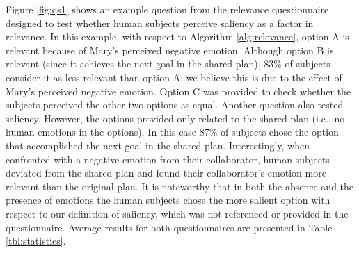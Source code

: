 \documentclass{article}
\begin{document}
Figure \ref{fig:qs1} shows an example question from the relevance questionnaire
designed to test whether human subjects perceive saliency as a factor in
relevance. In this example, with respect to Algorithm \ref{alg:relevance},
option A is relevant because of Mary's perceived negative emotion. Although
option B is relevant (since it achieves the next goal in the shared plan), 83\% of
subjects consider it as less relevant than option A; we believe this is due to
the effect of Mary's perceived negative emotion. Option C was provided to
check whether the subjects perceived the other two options as equal. Another
question also tested saliency. However, the options provided only related to the
shared plan (i.e., no human emotions in the options). In this case 87\% of
subjects chose the option that accomplished the next goal in the shared plan.
Interestingly, when confronted with a negative emotion from their collaborator,
human subjects deviated from the shared plan and found their collaborator's
emotion more relevant than the original plan. It is noteworthy that in both the
absence and the presence of emotions the human subjects chose the more salient
option with respect to our definition of saliency, which was not referenced or
provided in the questionnaire. Average results for both questionnaires are
presented in Table \ref{tbl:statistics}.

% 
\end{document}
